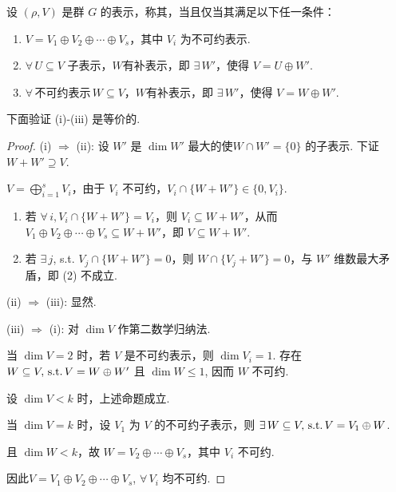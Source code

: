 \begin{definition}
    设 $(\rho, V)$ 是群 $G$ 的表示，称其，当且仅当其满足以下任一条件：
    \begin{enumerate}[label=(\roman*)]
        \item $V = V_1 \oplus V_2 \oplus \cdots \oplus V_s$，其中 $V_i$ 为不可约表示.
        \item $\forall\, U \subseteq V$ 子表示，$W$有补表示，即 $\exists\, W'$，使得 $V = U \oplus W'$.
        \item $\forall\, \text{不可约表示}\, W \subseteq V$，$W$有补表示，即 $\exists\, W'$，使得 $V = W \oplus W'$.
    \end{enumerate}
\end{definition}

下面验证 (i)-(iii) 是等价的.
\begin{proof}
    (i) $\Rightarrow$ (ii): 设 $W'$ 是 $\dim W'$ 最大的使$W \cap W' = \{0\}$ 的子表示. 下证 $W + W' \supseteq V$.\par
    $V = \bigoplus_{i=1}^s V_i$，由于 $V_i$ 不可约，$V_i \cap \{W + W'\} \in \{0, V_i\}$.
    \begin{enumerate}[label=(\arabic*),
        leftmargin=3.5em]
        \item 若 $\forall\, i, V_i \cap \{W + W'\} = V_i$，则 $V_i \subseteq W + W'$，从而 $V_1 \oplus V_2 \oplus \cdots \oplus V_s \subseteq W + W'$，即 $V \subseteq W + W'$.
        \item 若 $\exists\, j$, s.t. $V_j \cap \{W + W'\} = 0$，则 $W \cap \{V_j + W'\} = 0$，与 $W'$ 维数最大矛盾，即 (2) 不成立.
    \end{enumerate}\par
    (ii) $\Rightarrow$ (iii): 显然. \par
    (iii) $\Rightarrow$ (i): 对 $\dim V$ 作第二数学归纳法.\par
    当 $\dim V = 2$ 时，若 $V$ 是不可约表示，则 $\dim V_i = 1$. 存在 $W \subseteq V,\operatorname{\,\text{s.t.}} V = W \oplus W'$ 且 $\dim W \leq 1$, 因而 $W$ 不可约.\par
    设 $\dim V < k$ 时，上述命题成立.\par
    当 $\dim V = k$ 时，设 $V_1$ 为 $V$ 的不可约子表示，则 $\exists\, W \subseteq V,\operatorname{\,\text{s.t.}} V = V_1 \oplus W$.\par
    且 $\dim W < k$，故 $W = V_2 \oplus \cdots \oplus V_s$，其中 $V_i$ 不可约.\par
    因此$V = V_1 \oplus V_2 \oplus \cdots \oplus V_s$, $\forall\, V_i$ 均不可约.
\end{proof}

